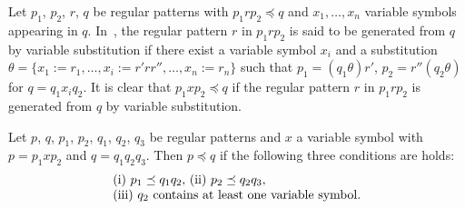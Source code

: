 Let $p_{1}$, $p_{2}$, $r$, $q$ be regular patterns with $p_{1}rp_{2} \preceq q$ and
$x_{1},\ldots,x_{n}$ variable symbols appearing in $q$.
In~\cite{Mukouchi1991}, the regular pattern $r$ in $p_{1}rp_{2}$ is said to be generated from $q$ by variable substitution if
there exist a variable symbol $x_{i}$ and a substitution
$\theta = \{x_{1}:=r_{1},\ldots,x_{i}:=r'rr'',\ldots,x_{n}:=r_{n}\}$ such that
$p_{1} = (q_{1}\theta)r'$, $p_{2} = r''(q_{2}\theta)$ for $q = q_{1}x_{i}q_{2}$.
It is clear that $p_{1}xp_{2} \preceq q$ if the regular pattern $r$ in $p_{1}rp_{2}$ is generated from $q$ by variable substitution.
%


\begin{thm}\label{Sato1:Lemma9}
    Let $p$, $q$, $p_{1}$, $p_{2}$, $q_{1}$, $q_{2}$, $q_{3}$ be regular patterns and $x$ a variable symbol with
    $p = p_{1}xp_{2}$ and $q = q_{1}q_{2}q_{3}$.
    Then $p \preceq q$ if the following three conditions are holds:
    \[
        \begin{tabular}{ll}
            $(\mathrm{i})$ $p_{1} \preceq q_{1}q_{2},$
            $(\mathrm{ii})$ $p_{2} \preceq q_{2}q_{3},$ \\
            $(\mathrm{iii})$ $q_{2}$ contains at least one variable symbol.
        \end{tabular}
    \]
\end{thm}

